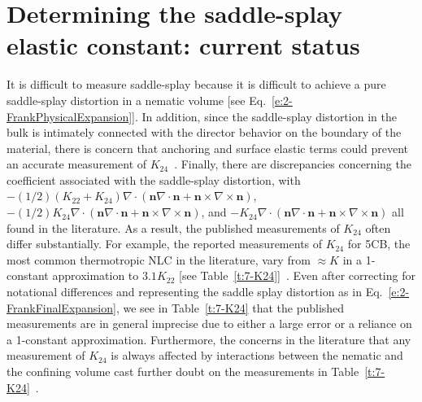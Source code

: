 \section{Determining the saddle-splay elastic constant: current status}
It is difficult to measure saddle-splay because it is difficult to achieve a pure saddle-splay distortion in a nematic volume [see Eq.~\ref{e:2-FrankPhysicalExpansion}].
In addition, since the saddle-splay distortion in the bulk is intimately connected with the director behavior on the boundary of the material, there is concern that anchoring and surface elastic terms could prevent an accurate measurement of $K_{24}$~\cite{RN191,RN55,sidky2018silico}.
Finally, there are discrepancies concerning the coefficient associated with the saddle-splay distortion, with
$-(1/2)(K_{22} + K_{24})\nabla \cdot (\mathbf{n}\nabla \cdot \mathbf{n} + \mathbf{n} \times \nabla \times \mathbf{n})$,
$-(1/2)K_{24}\nabla \cdot (\mathbf{n}\nabla \cdot \mathbf{n} + \mathbf{n} \times \nabla \times \mathbf{n})$,
and $-K_{24}\nabla \cdot (\mathbf{n}\nabla \cdot \mathbf{n} + \mathbf{n} \times \nabla \times \mathbf{n})$ all found in the literature.
As a result, the published measurements of $K_{24}$ often differ substantially.
For example, the reported measurements of $K_{24}$ for 5CB, the most common thermotropic NLC in the literature, vary from $\approx K$ in a 1-constant approximation  to $3.1 K_{22}$ [see Table~\ref{t:7-K24}]~\cite{RN24,allender1991determination,polak1994optical,sparavigna1994periodic}.
Even after correcting for notational differences and representing the saddle splay distortion as in Eq.~\ref{e:2-FrankFinalExpansion}, we see in Table~\ref{t:7-K24} that the published measurements are in general imprecise due to either a large error or a reliance on a 1-constant approximation.
Furthermore, the concerns in the literature that any measurement of $K_{24}$ is always affected by interactions between the nematic and the confining volume cast further doubt on the measurements in Table~\ref{t:7-K24}~\cite{RN55,RN191,sidky2018silico}.
